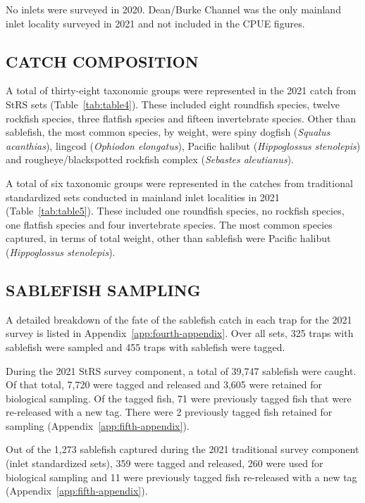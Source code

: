 \documentclass[12pt]{article}\usepackage[]{graphicx}\usepackage[]{color}
\begin{document}
No inlets were surveyed in 2020. Dean/Burke Channel was the only mainland inlet locality surveyed in 2021 and not included in the CPUE figures.

\hypertarget{catch-composition}{%
\subsection{CATCH COMPOSITION}\label{catch-composition}}

A total of thirty-eight taxonomic groups were represented in the 2021 catch from StRS sets (Table~\ref{tab:table4}). These included eight roundfish species, twelve rockfish species, three flatfish species and fifteen invertebrate species. Other than sablefish, the most common species, by weight, were spiny dogfish (\emph{Squalus acanthias}), lingcod (\emph{Ophiodon elongatus}), Pacific halibut (\emph{Hippoglossus stenolepis}) and rougheye/blackspotted rockfish complex (\emph{Sebastes aleutianus}).

A total of six taxonomic groups were represented in the catches from traditional standardized sets conducted in mainland inlet localities in 2021 (Table~\ref{tab:table5}). These included one roundfish species, no rockfish species, one flatfish species and four invertebrate species. The most common species captured, in terms of total weight, other than sablefish were Pacific halibut (\emph{Hippoglossus stenolepis}).

\hypertarget{sablefish-sampling}{%
\subsection{SABLEFISH SAMPLING}\label{sablefish-sampling}}

A detailed breakdown of the fate of the sablefish catch in each trap for the 2021 survey is listed in Appendix~\ref{app:fourth-appendix}. Over all sets, 325 traps with sablefish were sampled and 455 traps with sablefish were tagged.

During the 2021 StRS survey component, a total of 39,747 sablefish were caught. Of that total, 7,720 were tagged and released and 3,605 were retained for biological sampling. Of the tagged fish, 71 were previously tagged fish that were re-released with a new tag. There were 2 previously tagged fish retained for sampling (Appendix~\ref{app:fifth-appendix}).

Out of the 1,273 sablefish captured during the 2021 traditional survey component (inlet standardized sets), 359 were tagged and released, 260 were used for biological sampling and 11 were previously tagged fish re-released with a new tag (Appendix~\ref{app:fifth-appendix}).
\end{document}
